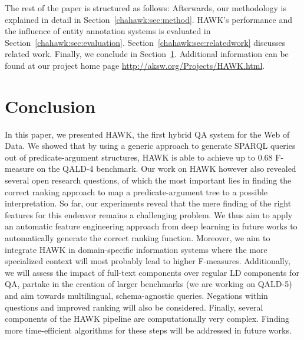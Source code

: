 The rest of the paper is structured as follows:
Afterwards, our methodology is explained in detail in Section~\ref{chahawk:sec:method}.
HAWK's performance and the influence of entity annotation systems is evaluated in Section~\ref{chahawk:sec:evaluation}. 
Section~\ref{chahawk:sec:relatedwork} discusses related work.  
Finally, we conclude in Section~\ref{chahawk:sec:conclusion}. Additional information can be found at our project home page \url{http://aksw.org/Projects/HAWK.html}.

%





\section{Conclusion}
\label{chahawk:sec:conclusion}
In this paper, we presented HAWK, the first hybrid QA system for the Web of Data. We showed that by using a generic approach to generate SPARQL queries out of predicate-argument structures, HAWK is able to achieve up to 0.68 F-measure on the QALD-4 benchmark. Our work on HAWK however also revealed several open research questions, of which the most important lies in finding the correct ranking approach to map a predicate-argument tree to a possible interpretation. So far, our experiments reveal that the mere finding of the right features for this endeavor remains a challenging problem. We thus aim to apply an automatic feature engineering approach from deep learning in future works to automatically generate the correct ranking function. Moreover, we aim to integrate HAWK in domain-specific information systems where the more specialized context will most probably lead to higher F-measures. Additionally, we will assess the impact of full-text components over regular LD components for QA, partake in the creation of larger benchmarks (we are working on QALD-5) and aim towards multilingual, schema-agnostic queries. Negations within questions and improved ranking will also be considered. Finally, several components of the HAWK pipeline are computationally very complex. Finding more time-efficient algorithms for these steps will be addressed in future works.

